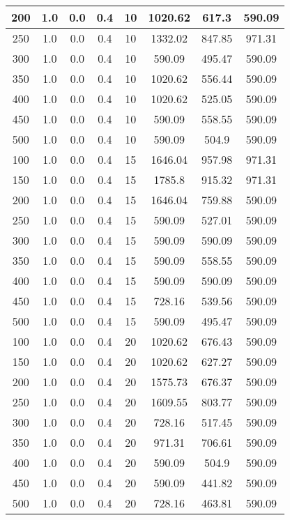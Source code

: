 \documentclass[a4paper, 12pt]{extreport}
\begin{document}
\begin{itemize}
\begin{longtable}{|c|c|c|c|c|c|c|c|}
			200 & 1.0 & 0.0 & 0.4 & 10 & 1020.62 & 617.3 & 590.09 \\\hline
			250 & 1.0 & 0.0 & 0.4 & 10 & 1332.02 & 847.85 & 971.31 \\\hline
			300 & 1.0 & 0.0 & 0.4 & 10 & 590.09 & 495.47 & 590.09 \\\hline
			350 & 1.0 & 0.0 & 0.4 & 10 & 1020.62 & 556.44 & 590.09 \\\hline
			400 & 1.0 & 0.0 & 0.4 & 10 & 1020.62 & 525.05 & 590.09 \\\hline
			450 & 1.0 & 0.0 & 0.4 & 10 & 590.09 & 558.55 & 590.09 \\\hline
			500 & 1.0 & 0.0 & 0.4 & 10 & 590.09 & 504.9 & 590.09 \\\hline
			100 & 1.0 & 0.0 & 0.4 & 15 & 1646.04 & 957.98 & 971.31 \\\hline
			150 & 1.0 & 0.0 & 0.4 & 15 & 1785.8 & 915.32 & 971.31 \\\hline
			200 & 1.0 & 0.0 & 0.4 & 15 & 1646.04 & 759.88 & 590.09 \\\hline
			250 & 1.0 & 0.0 & 0.4 & 15 & 590.09 & 527.01 & 590.09 \\\hline
			300 & 1.0 & 0.0 & 0.4 & 15 & 590.09 & 590.09 & 590.09 \\\hline
			350 & 1.0 & 0.0 & 0.4 & 15 & 590.09 & 558.55 & 590.09 \\\hline
			400 & 1.0 & 0.0 & 0.4 & 15 & 590.09 & 590.09 & 590.09 \\\hline
			450 & 1.0 & 0.0 & 0.4 & 15 & 728.16 & 539.56 & 590.09 \\\hline
			500 & 1.0 & 0.0 & 0.4 & 15 & 590.09 & 495.47 & 590.09 \\\hline
			100 & 1.0 & 0.0 & 0.4 & 20 & 1020.62 & 676.43 & 590.09 \\\hline
			150 & 1.0 & 0.0 & 0.4 & 20 & 1020.62 & 627.27 & 590.09 \\\hline
			200 & 1.0 & 0.0 & 0.4 & 20 & 1575.73 & 676.37 & 590.09 \\\hline
			250 & 1.0 & 0.0 & 0.4 & 20 & 1609.55 & 803.77 & 590.09 \\\hline
			300 & 1.0 & 0.0 & 0.4 & 20 & 728.16 & 517.45 & 590.09 \\\hline
			350 & 1.0 & 0.0 & 0.4 & 20 & 971.31 & 706.61 & 590.09 \\\hline
			400 & 1.0 & 0.0 & 0.4 & 20 & 590.09 & 504.9 & 590.09 \\\hline
			450 & 1.0 & 0.0 & 0.4 & 20 & 590.09 & 441.82 & 590.09 \\\hline
			500 & 1.0 & 0.0 & 0.4 & 20 & 728.16 & 463.81 & 590.09 \\\hline

\end{longtable}
\end{itemize}
\end{document}
